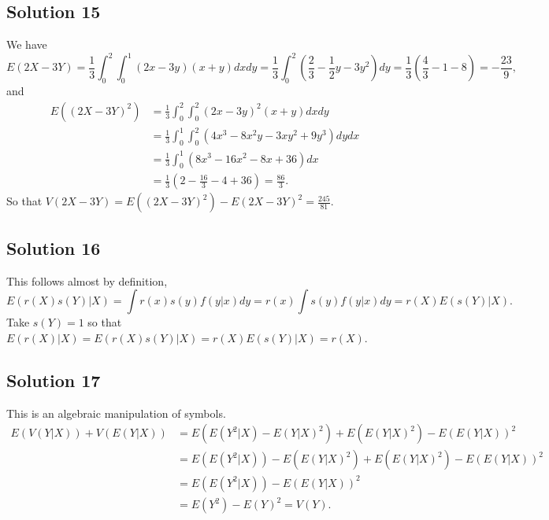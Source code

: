 \subsection*{Solution 15}

We have
\begin{equation*}
E(2X - 3Y) = \frac{1}{3} \int_0^2 \int_0^1 (2x - 3y)(x + y) dx dy
    = \frac{1}{3} \int_0^2 (\frac{2}{3} - \frac{1}{2}y - 3y^2) dy
    = \frac{1}{3} (\frac{4}{3} - 1 - 8)
    = - \frac{23}{9},
\end{equation*}
and
\begin{equation*}
\begin{split}
E((2X - 3Y)^2) &= \frac{1}{3} \int_0^2 \int_0^2 (2x - 3y)^2 (x + y) dx dy \\
    &= \frac{1}{3} \int_0^1 \int_0^2 (4x^3 - 8x^2y - 3xy^2 + 9y^3) dy dx \\
    &= \frac{1}{3} \int_0^1 (8x^3 - 16x^2 - 8x + 36) dx \\
    &= \frac{1}{3} (2 - \frac{16}{3} - 4 + 36)
    = \frac{86}{3}.
\end{split}
\end{equation*}
So that $V(2X - 3Y) = E((2X - 3Y)^2) - E(2X - 3Y)^2 = \frac{245}{81}$.


\subsection*{Solution 16}

This follows almost by definition,
\begin{equation*}
    E(r(X)s(Y)|X) = \int r(x)s(y) f(y|x) dy
        = r(x) \int s(y) f(y|x) dy
        = r(X) E(s(Y)|X).
\end{equation*}
Take $s(Y) = 1$ so that $E(r(X)|X) = E(r(X)s(Y)|X) = r(X) E(s(Y)|X) = r(X)$.


\subsection*{Solution 17}

This is an algebraic manipulation of symbols.
\begin{equation*}
    \begin{split}
        E(V(Y|X)) + V(E(Y|X)) &= E(E(Y^2|X) - E(Y|X)^2) + E(E(Y|X)^2) - E(E(Y|X))^2 \\
            &= E(E(Y^2|X)) - E(E(Y|X)^2) + E(E(Y|X)^2) - E(E(Y|X))^2 \\
            &= E(E(Y^2|X)) - E(E(Y|X))^2 \\
            &= E(Y^2) - E(Y)^2
            = V(Y).
    \end{split}
\end{equation*}


